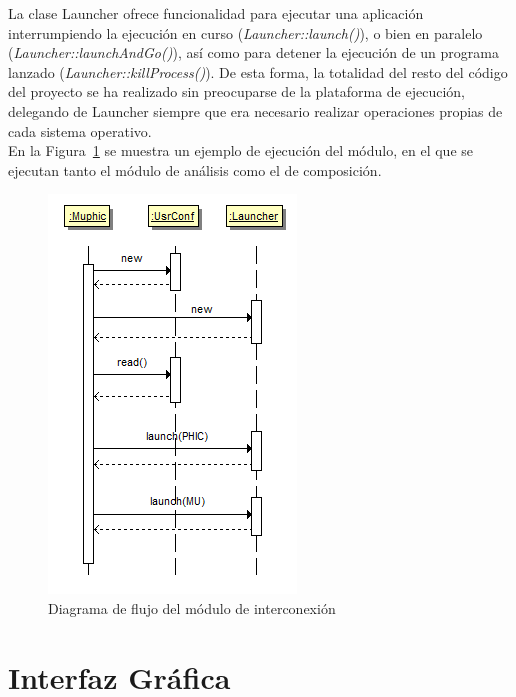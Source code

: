 La clase Launcher ofrece funcionalidad para ejecutar una aplicación interrumpiendo la ejecución en curso (\emph{Launcher::launch()}), o bien en paralelo (\emph{Launcher::launchAndGo()}), así como para detener la ejecución de un programa lanzado (\emph{Launcher::killProcess()}). De esta forma, la totalidad del resto del código del proyecto se ha realizado sin preocuparse de la plataforma de ejecución, delegando de Launcher siempre que era necesario realizar operaciones propias de cada sistema operativo.\\

En la Figura~\ref{fig:muphic-sec-diagram} se muestra un ejemplo de ejecución del módulo, en el que se ejecutan tanto el módulo de análisis como el de composición.

		\begin{figure}[!htbp]
		\centering
		\includegraphics[scale=0.6]{graphics/muphic-sec-diagram.png}
		\caption{Diagrama de flujo del módulo de interconexión}
		\label{fig:muphic-sec-diagram}
		\end{figure}

\section{Interfaz Gráfica}

